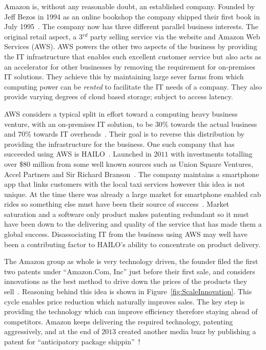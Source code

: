 
{}






Amazon is, without any reasonable doubt, an established company. 
Founded by Jeff Bezos in 1994 as an online bookshop the company shipped their first book in July 1995~\cite{seattle}. 
The company now has three different parallel business interests. 
The original retail aspect, a 3$^{rd}$ party selling service via the website and Amazon Web Services (AWS).
AWS powers the other two aspects of the business by providing the IT infrastructure that enables such excellent customer service but also acts as an accelerator for other businesses by removing the requirement for on-premises IT solutions. 
They achieve this by maintaining large sever farms from which computing power can be \emph{rented} to facilitate the IT needs of a company. 
They also provide varying degrees of cloud based storage; subject to access latency.

AWS considers a typical split in effort toward a computing heavy business venture, with an on-premises IT solution, to be $30\%$ towards the actual business and $70\%$ towards IT overheads~\cite{gavin2014ams}. 
Their goal is to reverse this distribution by providing the infrastructure for the business. 
One such company that has succeeded using AWS is HAILO~\cite{gavin2014ams}. 
Launched in $2011$ with investments totalling over \$$80$ million from some well known sources such as Union Square Ventures, Accel Partners and Sir Richard Branson~\cite{hailo}.
The company maintains a smartphone app that links customers with the local taxi services however this idea is not unique. 
At the time there was already a large market for smartphone enabled cab rides so something else must have been their source of success~\cite{ventureBeat}. 
Market saturation and a software only product makes patenting redundant so it must have been down to the delivering and quality of the service that has made them a global success. 
Disassociating IT from the business using AWS may well have been a contributing factor to HAILO's ability to concentrate on product delivery.


The Amazon group as whole is very technology driven, the founder filed the first two patents under ``Amazon.Com, Inc'' just before their first sale, and considers innovations as the best method to drive down the prices of the products they sell~\cite{bezos1998secure1,bezos1998secure2}. 
Reasoning behind this idea is shown in Figure~\ref{fig:ScaleInnovation}.
This cycle enables price reduction which naturally improves sales. 
The key step is providing the technology which can improve efficiency therefore staying ahead of competitors. 
Amazon keeps delivering the required technology, patenting aggressively, and at the end of $2013$ created another media buzz by publishing a patent for ``anticipatory package shippin''~\cite{spiegel2013method}!



